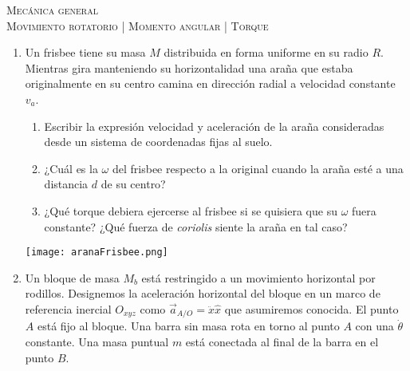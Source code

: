 \documentclass[11pt,spanish,a4paper]{article}
\begin{document}
\begin{center}
  \textsc{\large Mecánica general}\\
  \textsc{\large Movimiento rotatorio | Momento angular | Torque}
\end{center}

\begin{enumerate}


\subsection*{Movimiento rotatorio}

\item
\begin{minipage}[t][6cm]{0.65\textwidth}
Un frisbee tiene su masa $M$ distribuida en forma uniforme en su radio $R$.
Mientras gira manteniendo su horizontalidad una araña que estaba originalmente en su centro camina en dirección radial a velocidad constante $v_a$.
\begin{enumerate}[label=\alph*)]
	\item Escribir la expresión velocidad y aceleración de la araña consideradas desde un sistema de coordenadas fijas al suelo.
	\item ¿Cuál es la $\omega$ del frisbee respecto a la original cuando la araña esté a una distancia $d$ de su centro?
	\item ¿Qué torque debiera ejercerse al frisbee si se quisiera que su $\omega$ fuera constante?
	¿Qué fuerza de \emph{coriolis} siente la araña en tal caso?
\end{enumerate}
\end{minipage}
\begin{minipage}[c][0cm][t]{0.3\textwidth}
	\texttt{[image: aranaFrisbee.png]}
\end{minipage}


\item
\begin{minipage}[t][9cm]{0.65\textwidth}
Un bloque de masa $M_b$ está restringido a un movimiento horizontal por rodillos.
Designemos la aceleración horizontal del bloque en un marco de referencia inercial $O_{xyz}$ como $\vec{a}_{A/O} = \ddot{x} \hat{x}$ que asumiremos conocida.
El punto $A$ está fijo al bloque.
Una barra sin masa rota en torno al punto $A$ con una $\dot{\theta}$ constante.
Una masa puntual $m$ está conectada al final de la barra en el punto $B$.


\end{minipage}
\end{enumerate}
\end{document}
